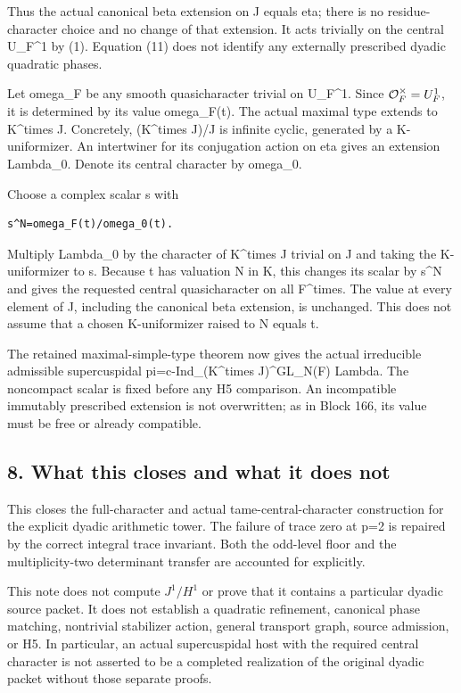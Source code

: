 Thus the actual canonical beta extension on J equals eta; there is no
residue-character choice and no change of that extension. It acts
trivially on the central U\_F\^{}1 by (1). Equation (11) does not
identify any externally prescribed dyadic quadratic phases.

Let omega\_F be any smooth quasicharacter trivial on U\_F\^{}1. Since
\(\mathcal O_F^\times=U_F^1\), it is determined by its value
omega\_F(t). The actual maximal type extends to K\^{}times J.
Concretely, (K\^{}times J)/J is infinite cyclic, generated by a
K-uniformizer. An intertwiner for its conjugation action on eta gives an
extension Lambda\_0. Denote its central character by omega\_0.

Choose a complex scalar s with

\begin{Verbatim}[fontsize=\small,breaklines=true,breakanywhere=true]
s^N=omega_F(t)/omega_0(t).
\end{Verbatim}

Multiply Lambda\_0 by the character of K\^{}times J trivial on J and
taking the K-uniformizer to s. Because t has valuation N in K, this
changes its scalar by s\^{}N and gives the requested central
quasicharacter on all F\^{}times. The value at every element of J,
including the canonical beta extension, is unchanged. This does not
assume that a chosen K-uniformizer raised to N equals t.

The retained maximal-simple-type theorem now gives the actual
irreducible admissible supercuspidal pi=c-Ind\_(K\^{}times
J)\^{}GL\_N(F) Lambda. The noncompact scalar is fixed before any H5
comparison. An incompatible immutably prescribed extension is not
overwritten; as in Block 166, its value must be free or already compatible.

\hypertarget{dyadic_character-what-this-closes-and-what-it-does-not}{%
\subsection{8. What this closes and what it does
not}\label{dyadic_character-what-this-closes-and-what-it-does-not}}

This closes the full-character and actual tame-central-character
construction for the explicit dyadic arithmetic tower. The failure of
trace zero at p=2 is repaired by the correct integral trace invariant.
Both the odd-level floor and the multiplicity-two determinant transfer
are accounted for explicitly.

This note does not compute \(J^1/H^1\) or prove that it
contains a particular dyadic source packet. It does not establish a
quadratic refinement, canonical phase matching, nontrivial stabilizer
action, general transport graph, source admission, or H5. In particular,
an actual supercuspidal host with the required central character is not
asserted to be a completed realization of the original dyadic packet
without those separate proofs.

